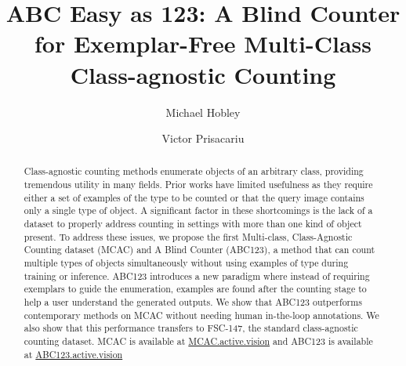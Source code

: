\documentclass[runningheads]{llncs}
\begin{document}
\title{ABC Easy as 123: A Blind Counter \\ for Exemplar-Free Multi-Class  \\ Class-agnostic Counting} 


\author{Michael Hobley \and
Victor Prisacariu}




\maketitle

\begin{abstract}
Class-agnostic counting methods enumerate objects of an arbitrary class, providing tremendous utility in many fields. Prior works have limited usefulness as they require either a set of examples of the type to be counted or that the query image contains only a single type of object. A significant factor in these shortcomings is the lack of a dataset to properly address counting in settings with more than one kind of object present. To address these issues, we propose the first Multi-class, Class-Agnostic Counting dataset (MCAC) and A Blind Counter (ABC123), a method that can count multiple types of objects simultaneously without using examples of type during training or inference. ABC123 introduces a new paradigm where instead of requiring exemplars to guide the enumeration, examples are found after the counting stage to help a user understand the generated outputs. We show that ABC123 outperforms contemporary methods on MCAC without needing human in-the-loop annotations. We also show that this performance transfers to FSC-147, the standard class-agnostic counting dataset. MCAC is available at \url{MCAC.active.vision} and ABC123 is available at \url{ABC123.active.vision}
\end{abstract}
\end{document}
